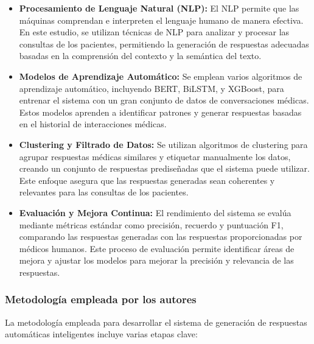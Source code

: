		\begin{itemize}
			\item \textbf{Procesamiento de Lenguaje Natural (NLP):} El NLP permite que las máquinas comprendan e interpreten el lenguaje humano de manera efectiva. En este estudio, se utilizan técnicas de NLP para analizar y procesar las consultas de los pacientes, permitiendo la generación de respuestas adecuadas basadas en la comprensión del contexto y la semántica del texto.
				
			\item \textbf{	Modelos de Aprendizaje Automático: }Se emplean varios algoritmos de aprendizaje automático, incluyendo BERT, BiLSTM, y XGBoost, para entrenar el sistema con un gran conjunto de datos de conversaciones médicas. Estos modelos aprenden a identificar patrones y generar respuestas basadas en el historial de interacciones médicas.
				
			\item \textbf{	Clustering y Filtrado de Datos:} Se utilizan algoritmos de clustering para agrupar respuestas médicas similares y etiquetar manualmente los datos, creando un conjunto de respuestas prediseñadas que el sistema puede utilizar. Este enfoque asegura que las respuestas generadas sean coherentes y relevantes para las consultas de los pacientes.
				
			\item \textbf{	Evaluación y Mejora Continua:} El rendimiento del sistema se evalúa mediante métricas estándar como precisión, recuerdo y puntuación F1, comparando las respuestas generadas con las respuestas proporcionadas por médicos humanos. Este proceso de evaluación permite identificar áreas de mejora y ajustar los modelos para mejorar la precisión y relevancia de las respuestas.
				
		\end{itemize}

	\subsubsection{Metodología empleada por los autores}
		La metodología empleada para desarrollar el sistema de generación de respuestas automáticas inteligentes incluye varias etapas clave:
		
